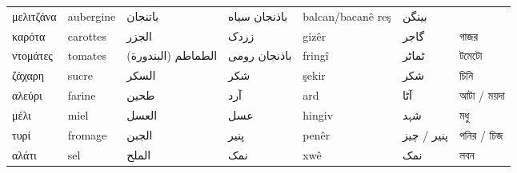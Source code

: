 \begin{longtable}{p{3.5cm} p{3.5cm} p{3.5cm} p{3.5cm} p{3.5cm} p{3.5cm} p{3.5cm} }
 μελιτζάνα                                  & aubergine                                                        & باتنجان                          & باذنجان سیاه        & balcan/bacanê reş          & بینگن                                                 &                                             \\
 καρότα                                     & carottes                                                         & الجزر                            & زردک                & gizêr                      & گاجر                                                  & গাজর                                        \\
 ντομάτες                                   & tomates                                                          & الطماطم (البندورة)               & باذنجان رومی        & fringî                     & ٹماٹر                                                 & টমেটো                                       \\
 ζάχαρη                                     & sucre                                                            & السكر                            & شکر                 & şekir                      & شکر                                                   & চিনি                                        \\
 αλεύρι                                     & farine                                                           & طحين                             & آرد                 & ard                        & آٹا                                                  & আটা / ময়দা                                  \\
 μέλι                                       & miel                                                             & العسل                            & عسل                 & hingiv                     & شہد                                                   & মধু                                         \\
 τυρί                                       & fromage                                                          & الجبن                            & پنیر                & penêr                      & پنیر / چیز                                            & পনির / চিজ                                  \\
 αλάτι                                      & sel                                                              & الملح                            & نمک                 & xwê                        & نمک                                                   & লবন                                         \\

\end{longtable}
